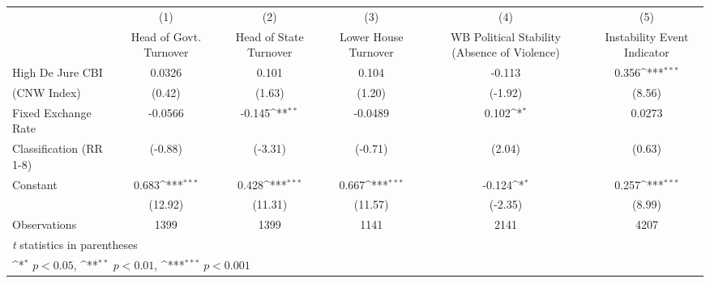 {
\def\sym#1{\ifmmode^{#1}\else\(^{#1}\)\fi}
\begin{tabular}{l*{5}{c}}
\hline\hline
                    &\multicolumn{1}{c}{(1)}&\multicolumn{1}{c}{(2)}&\multicolumn{1}{c}{(3)}&\multicolumn{1}{c}{(4)}&\multicolumn{1}{c}{(5)}\\
                    &\multicolumn{1}{c}{Head of Govt. Turnover}&\multicolumn{1}{c}{Head of State Turnover}&\multicolumn{1}{c}{Lower House Turnover}&\multicolumn{1}{c}{WB Political Stability (Absence of Violence)}&\multicolumn{1}{c}{Instability Event Indicator}\\
\hline
High De Jure CBI    &      0.0326         &       0.101         &       0.104         &      -0.113         &       0.356\sym{***}\\
(CNW Index)         &      (0.42)         &      (1.63)         &      (1.20)         &     (-1.92)         &      (8.56)         \\
[1em]
Fixed Exchange Rate &     -0.0566         &      -0.145\sym{**} &     -0.0489         &       0.102\sym{*}  &      0.0273         \\
Classification (RR 1-8)&     (-0.88)         &     (-3.31)         &     (-0.71)         &      (2.04)         &      (0.63)         \\
[1em]
Constant            &       0.683\sym{***}&       0.428\sym{***}&       0.667\sym{***}&      -0.124\sym{*}  &       0.257\sym{***}\\
                    &     (12.92)         &     (11.31)         &     (11.57)         &     (-2.35)         &      (8.99)         \\
\hline
Observations        &        1399         &        1399         &        1141         &        2141         &        4207         \\
\hline\hline
\multicolumn{6}{l}{\footnotesize \textit{t} statistics in parentheses}\\
\multicolumn{6}{l}{\footnotesize \sym{*} \(p<0.05\), \sym{**} \(p<0.01\), \sym{***} \(p<0.001\)}\\
\end{tabular}
}
